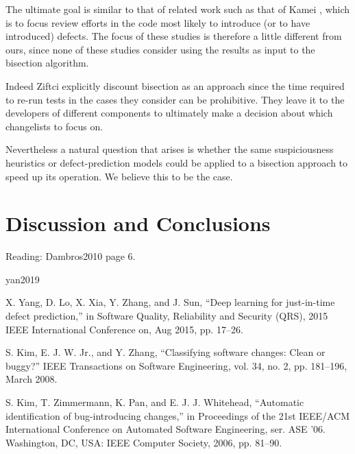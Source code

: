 \documentclass[10pt,journal,compsoc]{IEEEtran}
\begin{document}
The ultimate goal is similar to that of related work such as that of Kamei \etal, which is to focus review efforts in the code most likely to introduce (or to have introduced) defects. The focus of these studies is therefore a little different from ours, since none of these studies consider using the results as input to the bisection algorithm.

Indeed Ziftci \etal explicitly discount bisection as an approach since the time required to re-run tests in the cases they consider can be prohibitive. They leave it to the developers of different components to ultimately make a decision about which changelists to focus on.

Nevertheless a natural question that arises is whether the same suspiciousness heuristics or defect-prediction models could be applied to a bisection approach to speed up its operation. We believe this to be the case. 

\section{Discussion and Conclusions}

Reading: Dambros2010 page 6.


yan2019

X. Yang, D. Lo, X. Xia, Y. Zhang, and J. Sun, “Deep learning for just-in-time defect prediction,” in Software Quality, Reliability and Security (QRS), 2015 IEEE International Conference on, Aug 2015, pp. 17–26.

S. Kim, E. J. W. Jr., and Y. Zhang, “Classifying software changes: Clean or buggy?” IEEE Transactions on Software Engineering, vol. 34, no. 2, pp. 181–196, March 2008.

S. Kim, T. Zimmermann, K. Pan, and E. J. J. Whitehead, “Automatic identification of bug-introducing changes,” in Proceedings of the 21st IEEE/ACM International Conference on Automated Software Engineering, ser. ASE ’06. Washington, DC, USA: IEEE Computer Society, 2006, pp. 81–90.


 

%
%
\end{document}
